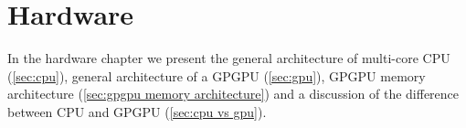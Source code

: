 \chapter{Hardware}
\label{chap:hardware}

In the hardware chapter we present the general architecture of multi-core CPU (\cref{sec:cpu}), general architecture of a GPGPU (\cref{sec:gpu}), GPGPU memory architecture (\cref{sec:gpgpu memory architecture}) and a discussion of the difference between CPU and GPGPU (\cref{sec:cpu vs gpu}).





